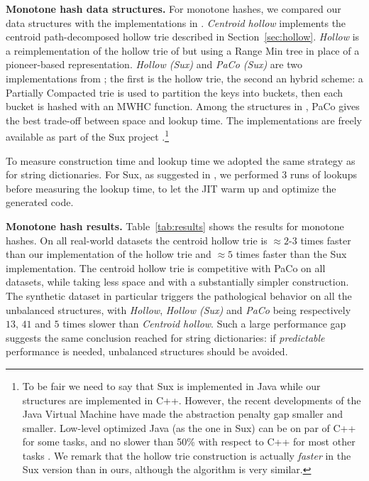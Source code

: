 \documentclass[a4paper,11pt]{article}
\newcommand{\ttlpar}[1]{\noindent\textbf{#1}}
\theoremstyle{nonumberplain}
\begin{document}
\ttlpar{Monotone hash data structures.} 
For monotone hashes, we
compared our data structures with the implementations in
\cite{monotonehash09}. \emph{Centroid hollow} implements the centroid
path-decomposed hollow trie described in Section~\ref{sec:hollow}.
\emph{Hollow} is a reimplementation of the hollow trie of
\cite{monotonehash09} but using a Range Min tree in place of a
pioneer-based representation. \emph{Hollow (Sux)} and \emph{PaCo
  (Sux)} are two implementations from \cite{monotonehash09}; the first
is the hollow trie, the second an hybrid scheme: a Partially Compacted
trie is used to partition the keys into buckets, then each bucket is
hashed with an MWHC function. Among the structures in
\cite{monotonehash09}, PaCo gives the best trade-off between space and
lookup time. The implementations are freely available as part of the Sux project \cite{sux}.\footnote{To be fair we need to
say that Sux is implemented in Java while our structures are
implemented in C++. However, the recent developments of the Java
Virtual Machine have made the abstraction penalty gap smaller and
smaller. Low-level optimized Java (as the one in Sux) can be on par of
C++ for some tasks, and no slower than 50\% with respect to C++ for
most other tasks \cite{shootout}. We remark that the hollow trie
construction is actually \emph{faster} in the Sux version than in
ours, although the algorithm is very similar.}

To measure construction time and lookup time we adopted the same
strategy as for string dictionaries. For Sux, as suggested in
\cite{monotonehash09}, we performed $3$ runs of lookups before
measuring the lookup time, to let the JIT warm up and optimize the
generated code. 

\ttlpar{Monotone hash results.} 
Table~\ref{tab:results} shows the
results for monotone hashes. On all real-world datasets the centroid
hollow trie is $\approx 2$-$3$ times faster than our implementation of
the hollow trie and $\approx 5$ times faster than the Sux
implementation. The centroid hollow trie is competitive with PaCo on
all datasets, while taking less space and with a substantially simpler
construction. The synthetic dataset in particular triggers the
pathological behavior on all the unbalanced structures, with
\emph{Hollow}, \emph{Hollow (Sux)} and \emph{PaCo} being respectively
$13$, $41$ and $5$ times slower than \emph{Centroid hollow}. 
Such a large performance gap suggests the same conclusion reached for string dictionaries:
if \emph{predictable} performance is needed, unbalanced structures should be avoided.
\end{document}
